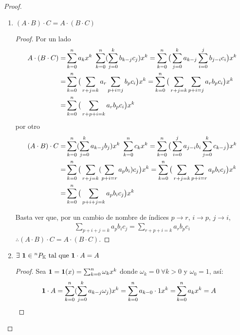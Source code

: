 \begin{proof}
\begin{enumerate}
 \item $ (A \cdot B) \cdot C = A \cdot (B \cdot C) $
 \begin{proof}
 Por un lado
  \begin{align*}
  A \cdot (B \cdot C) =& \sum_{k=0}^n a_k x^k\ \sum_{k=0}^n  (\sum_{j=0}^k b_{k-j}c_j )  x^k = \sum_{k=0}^n \big(  \sum_{j=0}^ka_{k-j}\sum_{i=0}^jb_{j-i}c_i \big) x^k \\
  =& \sum_{k=0}^n \big(  \sum_{r+j=k}a_r\sum_{p+i=j}b_pc_i \big) x^k = \sum_{k=0}^n \big(  \sum_{r+j=k}\sum_{p+i=j}a_rb_pc_i \big) x^k \\
  =& \sum_{k=0}^n \big(  \sum_{r+p+i=k}a_rb_pc_i \big) x^k 
  \end{align*}
  por otro
    \begin{align*}
  (A \cdot B) \cdot C =& \sum_{k=0}^n  (\sum_{j=0}^k a_{k-j}b_j )  x^k\ \sum_{k=0}^n c_k x^k = \sum_{k=0}^n \big( \sum_{i=0}^ja_{j-i}b_i  \sum_{j=0}^kc_{k-j} \big) x^k \\
  =& \sum_{k=0}^n \big(  \sum_{r+j=k}(\sum_{p+i=r}a_pb_i) c_j \big) x^k = \sum_{k=0}^n \big(  \sum_{r+j=k}\sum_{p+i=r}a_pb_ic_j \big) x^k \\
  =& \sum_{k=0}^n \big(  \sum_{p+i+j=k}a_pb_ic_j \big) x^k 
  \end{align*}
  
  Basta ver que, por un cambio de nombre de índices $p \to r$, $i \to p$, $j \to i$,
  \begin{align*}
   \sum_{p+i+j=k}a_pb_ic_j = \sum_{r+p+i=k}a_rb_pc_i
  \end{align*}   
  $\therefore (A \cdot B) \cdot C = A \cdot (B \cdot C)$.
 \end{proof}
 
 \item $\exists \ \textbf{1} \in {^{n}P_{\mathbb{K}}} \text{ tal que } \textbf{1}\cdot A = A $
 \begin{proof}
 Sea $ \textbf{1} = \textbf{1}(x) = \sum_{k=0}^n \omega_k x^k$ donde $\omega_k = 0 \ \forall k > 0$ y $\omega_0 = 1$, así:
 \begin{align*}
  \textbf{1} \cdot A = \sum_{k=0}^n  (\sum_{j=0}^k a_{k-j}\omega_j )  x^k = \sum_{k=0}^n  a_{k-0} \cdot 1  x^k 
  =& \sum_{k=0}^n a_k x^k = A 
 \end{align*}
 \end{proof}
 

\end{enumerate}
\end{proof}
